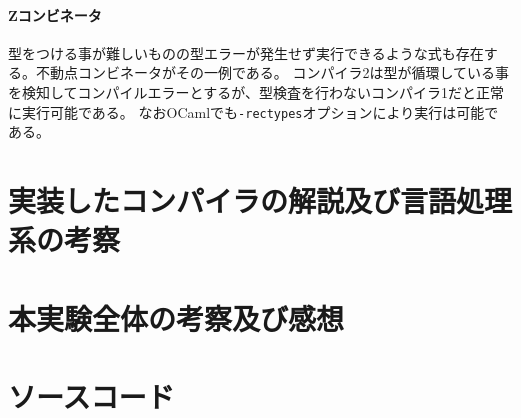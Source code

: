 \documentclass[report]{jlreq}
\begin{document}
      \subsubsection{Zコンビネータ}
        型をつける事が難しいものの型エラーが発生せず実行できるような式も存在する。不動点コンビネータがその一例である。
        コンパイラ2は型が循環している事を検知してコンパイルエラーとするが、型検査を行わないコンパイラ1だと正常に実行可能である。
        なおOCamlでも\texttt{-rectypes}オプションにより実行は可能である。
        

  \chapter{実装したコンパイラの解説及び言語処理系の考察}
  \chapter{本実験全体の考察及び感想}
  \chapter{ソースコード}
\end{document}
